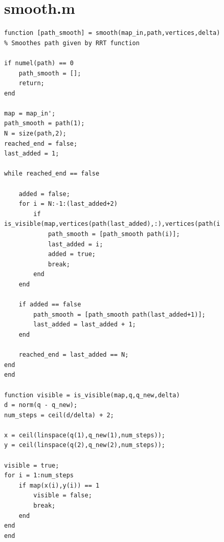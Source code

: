 \documentclass[journal]{IEEEtran}
\begin{document}
\begin{figure}
\section{smooth.m}\label{apsmooth}

\begin{verbatim}
function [path_smooth] = smooth(map_in,path,vertices,delta)
% Smoothes path given by RRT function

if numel(path) == 0
    path_smooth = [];
    return;
end

map = map_in';
path_smooth = path(1);
N = size(path,2);
reached_end = false;
last_added = 1;

while reached_end == false
    
    added = false;
    for i = N:-1:(last_added+2)
        if is_visible(map,vertices(path(last_added),:),vertices(path(i),:),delta)
            path_smooth = [path_smooth path(i)];
            last_added = i;
            added = true;
            break;
        end
    end
    
    if added == false
        path_smooth = [path_smooth path(last_added+1)];
        last_added = last_added + 1;
    end
    
    reached_end = last_added == N;
end
end

function visible = is_visible(map,q,q_new,delta)
d = norm(q - q_new);
num_steps = ceil(d/delta) + 2;

x = ceil(linspace(q(1),q_new(1),num_steps));
y = ceil(linspace(q(2),q_new(2),num_steps));

visible = true;
for i = 1:num_steps
    if map(x(i),y(i)) == 1
        visible = false;
        break;
    end
end
end
\end{verbatim}

\end{figure}

%
%
\end{document}
